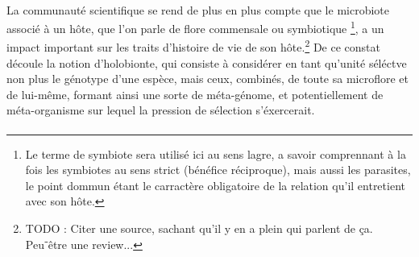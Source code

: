 
\paragraph{} %
\label{par:intro1}

La communauté scientifique se rend de plus en plus compte que le microbiote
associé à un hôte, que l'on parle de flore commensale ou symbiotique
\footnote{Le terme de symbiote sera utilisé ici au sens lagre, a savoir
comprennant à la fois les symbiotes au sens strict (bénéfice réciproque), mais
aussi les parasites, le point dommun étant le carractère obligatoire de la
relation qu'il entretient avec son hôte.}, a un impact important sur les
traits d'histoire de vie de son hôte.\footnote{TODO : Citer une source,
sachant qu'il y en a plein qui parlent de ça. Peu⁻être une review...} De ce
constat découle la notion d'holobionte, qui consiste à considérer en tant
qu'unité séléctve non plus le génotype d'une espèce, mais ceux, combinés, de
toute sa microflore et de lui-même, formant ainsi une sorte de méta-génome, et
potentiellement de méta-organisme sur lequel la pression de sélection
s'éxercerait.



\paragraph{} %
\label{par:intro1}




\paragraph{} %
\label{par:intro3}


